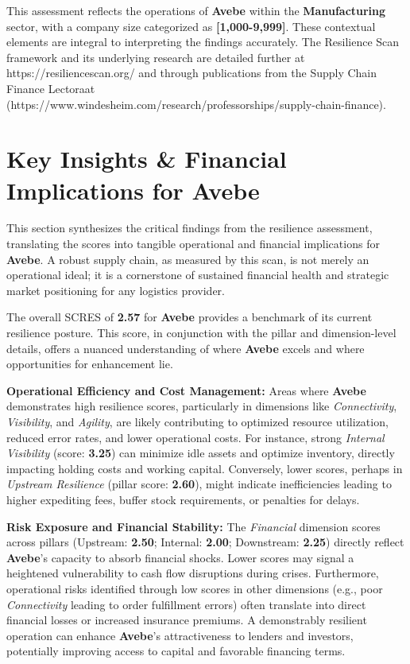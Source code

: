 \documentclass[
  oneside,
  open=any,
  fontsize=11pt]{scrbook}
\begin{document}
This assessment reflects the operations of \textbf{Avebe} within the
\textbf{Manufacturing} sector, with a company size categorized as
\textbf{{[}1,000-9,999{]}}. These contextual elements are integral to
interpreting the findings accurately. The Resilience Scan framework and
its underlying research are detailed further at
https://resiliencescan.org/ and through publications from the Supply
Chain Finance Lectoraat
(https://www.windesheim.com/research/professorships/supply-chain-finance).

\chapter{Key Insights \& Financial Implications for
Avebe}\label{key-insights-financial-implications-for-avebe}

This section synthesizes the critical findings from the resilience
assessment, translating the scores into tangible operational and
financial implications for \textbf{Avebe}. A robust supply chain, as
measured by this scan, is not merely an operational ideal; it is a
cornerstone of sustained financial health and strategic market
positioning for any logistics provider.

The overall SCRES of \textbf{2.57} for \textbf{Avebe} provides a
benchmark of its current resilience posture. This score, in conjunction
with the pillar and dimension-level details, offers a nuanced
understanding of where \textbf{Avebe} excels and where opportunities for
enhancement lie.

\textbf{Operational Efficiency and Cost Management:} Areas where
\textbf{Avebe} demonstrates high resilience scores, particularly in
dimensions like \emph{Connectivity}, \emph{Visibility}, and
\emph{Agility}, are likely contributing to optimized resource
utilization, reduced error rates, and lower operational costs. For
instance, strong \emph{Internal Visibility} (score: \textbf{3.25}) can
minimize idle assets and optimize inventory, directly impacting holding
costs and working capital. Conversely, lower scores, perhaps in
\emph{Upstream Resilience} (pillar score: \textbf{2.60}), might indicate
inefficiencies leading to higher expediting fees, buffer stock
requirements, or penalties for delays.

\textbf{Risk Exposure and Financial Stability:} The \emph{Financial}
dimension scores across pillars (Upstream: \textbf{2.50}; Internal:
\textbf{2.00}; Downstream: \textbf{2.25}) directly reflect
\textbf{Avebe}'s capacity to absorb financial shocks. Lower scores may
signal a heightened vulnerability to cash flow disruptions during
crises. Furthermore, operational risks identified through low scores in
other dimensions (e.g., poor \emph{Connectivity} leading to order
fulfillment errors) often translate into direct financial losses or
increased insurance premiums. A demonstrably resilient operation can
enhance \textbf{Avebe}'s attractiveness to lenders and investors,
potentially improving access to capital and favorable financing terms.
\end{document}

